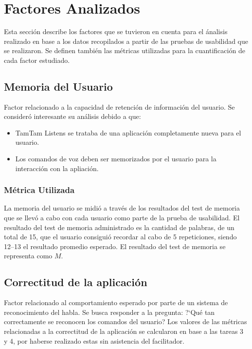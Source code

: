 \section{Factores Analizados}
\label{sec:factores}

Esta secci\'on describe los factores que se tuvieron en cuenta para el \'analisis realizado
en base a los datos recopilados a partir de las pruebas de usabilidad que se realizaron.
Se definen tambi\'en las m\'etricas utilizadas para la cuantificaci\'on de cada factor estudiado.

\subsection{Memoria del Usuario}
Factor relacionado a la capacidad de retenci\'on de informaci\'on del usuario.
Se consider\'o interesante su an\'alisis debido a que:
\begin{itemize}
	\item TamTam Listens se trataba de una aplicaci\'on completamente nueva para el usuario.
	\item Los comandos de voz deben ser memorizados por el usuario para la interacci\'on con
	la apliaci\'on.
\end{itemize}
\subsubsection{M\'etrica Utilizada}
La memoria del usuario se midi\'o a trav\'es de los resultados del test de memoria que se llev\'o
a cabo con cada usuario como parte de la prueba de usabilidad.
El resultado del test de memoria administrado es la cantidad de palabras, de un total de 15,
que el usuario consigui\'o recordar al cabo de 5 repeticiones, siendo 12--13 el resultado promedio
esperado. El resultado del test de memoria se representa como $M$.

\subsection{Correctitud de la aplicaci\'on}
Factor relacionado al comportamiento esperado por parte de un sistema de reconocimiento del
habla. Se busca responder a la pregunta: {?`}Qu\'e tan correctamente se reconocen los comandos 
del usuario?
Los valores de las m\'etricas relacionadas a la correctitud de la aplicaci\'on se calcularon
en base a las tareas 3 y 4, por haberse realizado estas sin asistencia del facilitador.  

